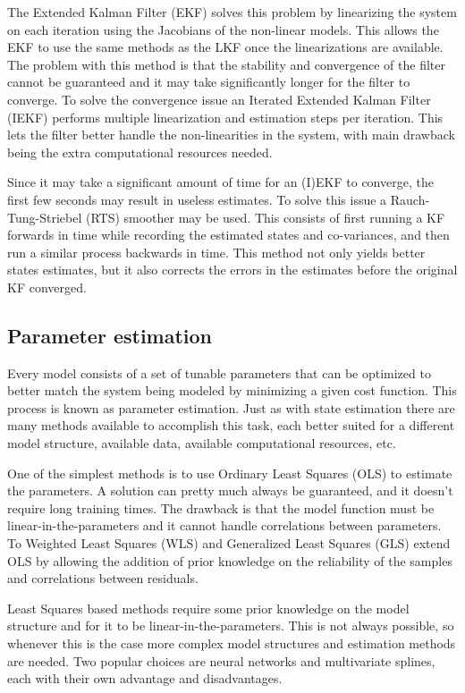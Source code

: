 The Extended Kalman Filter (EKF) solves this problem by linearizing the system on each iteration using the Jacobians of the non-linear models. This allows the EKF to use the same methods as the LKF once the linearizations are available. The problem with this method is that the stability and convergence of the filter cannot be guaranteed and it may take significantly longer for the filter to converge. To solve the convergence issue an Iterated Extended Kalman Filter (IEKF) performs multiple linearization and estimation steps per iteration. This lets the filter better handle the non-linearities in the system, with main drawback being the extra computational resources needed.

Since it may take a significant amount of time for an (I)EKF to converge, the first few seconds may result in useless estimates. To solve this issue a Rauch-Tung-Striebel (RTS) smoother may be used. This consists of first running a KF forwards in time while recording the estimated states and co-variances, and then run a similar process backwards in time. This method not only yields better states estimates, but it also corrects the errors in the estimates before the original KF converged.

\subsection{Parameter estimation}
Every model consists of a set of tunable parameters that can be optimized to better match the system being modeled by minimizing a given cost function. This process is known as parameter estimation. Just as with state estimation there are many methods available to accomplish this task, each better suited for a different model structure, available data, available computational resources, etc. 

One of the simplest methods is to use Ordinary Least Squares (OLS) to estimate the parameters. A solution can pretty much always be guaranteed, and it doesn't require long training times. The drawback is that the model function must be linear-in-the-parameters and it cannot handle correlations between parameters. To Weighted Least Squares (WLS) and Generalized Least Squares (GLS) extend OLS by allowing the addition of prior knowledge on the reliability of the samples and correlations between residuals.

Least Squares based methods require some prior knowledge on the model structure and for it to be linear-in-the-parameters. This is not always possible, so whenever this is the case more complex model structures and estimation methods are needed. Two popular choices are neural networks and multivariate splines, each with their own advantage and disadvantages.



